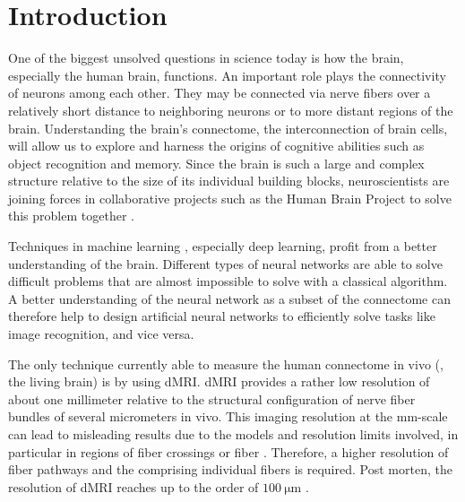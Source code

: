 \newpage\null\thispagestyle{empty}\newpage
\clearpage{\thispagestyle{empty}\cleardoublepage}
\cleardoublepage
% 
% 
% 
\setcounter{chapter}{0}
\chapter{Introduction}
\label{sec:intro}
% 
One of the biggest unsolved questions in science today is how the brain, especially the human brain, functions.
An important role plays the connectivity of neurons among each other.
They may be connected via nerve fibers over a relatively short distance to neighboring neurons or to more distant regions of the brain.
Understanding the brain's connectome, the interconnection of brain cells, will allow us to explore and harness the origins of cognitive abilities such as object recognition and memory.
Since the brain is such a large and complex structure relative to the size of its individual building blocks, neuroscientists are joining forces in collaborative projects such as the Human Brain Project to solve this problem together \cite{Markram2006, Shen2012, Amunts2013, Amunts2016}.
\par
% 
Techniques in machine learning \cite{murphy2013machine, Goodfellow-et-al-2016}, especially deep learning, profit from a better understanding of the brain. 
Different types of neural networks are able to solve difficult problems that are almost impossible to solve with a classical algorithm.
A better understanding of the neural network as a subset of the connectome can therefore help to design artificial neural networks to efficiently solve tasks like image recognition, and vice versa.
\par
% 
The only technique currently able to measure the human connectome in vivo (\ie{}, the living brain) is by using \ac{dMRI}.
\ac{dMRI} provides a rather low resolution of about one millimeter relative to the structural configuration of nerve fiber bundles of several micrometers in vivo.
This imaging resolution at the \si{\milli\meter}-scale can lead to misleading results due to the models and resolution limits involved, in particular in regions of fiber crossings or fiber  \cite{MaierHein2017, Schilling2021}.
Therefore, a higher resolution of fiber pathways and the comprising individual fibers is required.
Post morten, the resolution of \ac{dMRI} reaches up to the order of $\SI{100}{\micro\meter}$ \cite{beaujoin:hal-02876136}.
